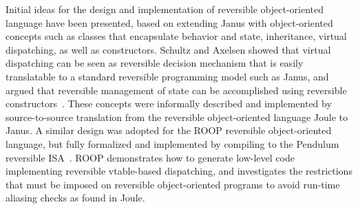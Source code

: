 %
%

Initial ideas for the design and implementation of reversible
object-oriented language have been presented, based on extending Janus
with object-oriented concepts such as classes that encapsulate
behavior and state, inheritance, virtual dispatching, as well as
constructors.  Schultz and Axelsen showed that virtual dispatching can
be seen as reversible decision mechanism that is easily translatable
to a standard reversible programming model such as Janus, and argued
that reversible management of state can be accomplished using
reversible constructors~\cite{joule:2016}. These concepts were
informally described and implemented by source-to-source translation
from the reversible object-oriented language Joule to Janus. A similar
design was adopted for the ROOP reversible object-oriented language,
but fully formalized and implemented by compiling to the Pendulum
reversible ISA~\cite{haulund:2016,roop:2017}. ROOP demonstrates how to
generate low-level code implementing reversible vtable-based
dispatching, and investigates the restrictions that must be imposed on
reversible object-oriented programs to avoid run-time aliasing checks
as found in Joule.

%
%
%
%
